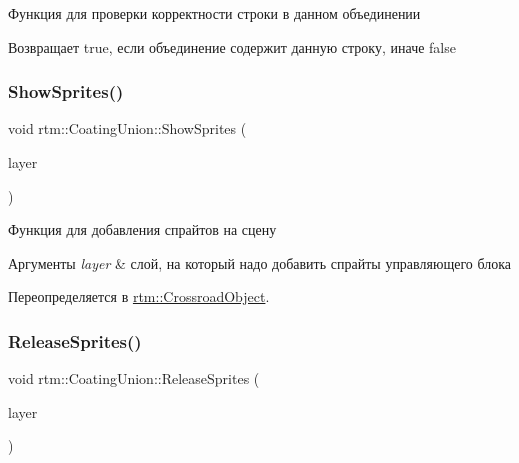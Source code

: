 Функция для проверки корректности строки в данном объединении \begin{DoxyReturn}{Возвращает}
true, если объединение содержит данную строку, иначе false 
\end{DoxyReturn}
\mbox{\label{classrtm_1_1_coating_union_ae95be187677aec759723edb4d14b35c1}} 
\subsubsection{\texorpdfstring{Show\+Sprites()}{ShowSprites()}}
{\footnotesize\ttfamily void rtm\+::\+Coating\+Union\+::\+Show\+Sprites (\begin{DoxyParamCaption}\item[{cocos2d\+::\+Layer $\ast$const}]{layer }\end{DoxyParamCaption})\hspace{0.3cm}{\ttfamily [virtual]}}

Функция для добавления спрайтов на сцену 
\begin{DoxyParams}{Аргументы}
{\em layer} & слой, на который надо добавить спрайты управляющего блока \\
\hline
\end{DoxyParams}


Переопределяется в \hyperlink{classrtm_1_1_crossroad_object_a2de2a5dac2ba2ca573cfa65a2633de9b}{rtm\+::\+Crossroad\+Object}.

\mbox{\label{classrtm_1_1_coating_union_a4e046aae25ce91da0408ac31a0de4e21}} 
\subsubsection{\texorpdfstring{Release\+Sprites()}{ReleaseSprites()}}
{\footnotesize\ttfamily void rtm\+::\+Coating\+Union\+::\+Release\+Sprites (\begin{DoxyParamCaption}\item[{cocos2d\+::\+Layer $\ast$const}]{layer }\end{DoxyParamCaption})\hspace{0.3cm}{\ttfamily [virtual]}}

